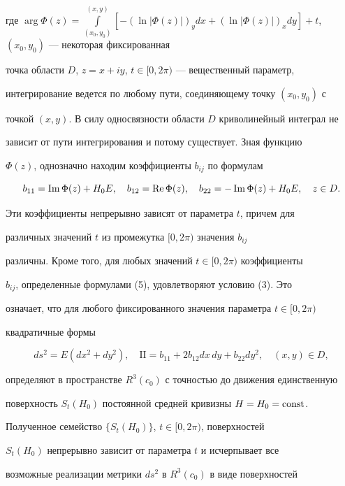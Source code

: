 где $\arg \Phi(z)=\int\limits^{(x,y)}_{(x_0,y_0)} [-(\ln|\Phi(z)|)_y dx+ 


(\ln|\Phi(z)|)_x dy]+t$, $(x_0,y_0)$ --- некоторая фиксированная 


точка области $D$, $z=x+iy$, $t\in[0,2\pi)$ --- вещественный параметр, 


интегрирование ведется по любому пути, соединяющему точку $(x_0,y_0)$ с 


точкой $(x,y)$. В силу односвязности области $D$ криволинейный интеграл не 


зависит от пути интегрирования и потому существует. Зная функцию 


$\Phi(z)$, однозначно находим коэффициенты $b_{ij}$ по формулам 


\begin{equation} 


b_{11}=\im\Phi(z)+H_0E,\quad b_{12}=\re\Phi(z),\quad 


b_{22}=-\im\Phi(z)+H_0E,\quad z\in D. 


\end{equation} 


Эти коэффициенты непрерывно зависят от параметра $t$, причем для 


различных значений $t$ из промежутка $[0,2\pi)$ значения $b_{ij}$ 


различны. Кроме того, для любых значений $t\in[0,2\pi)$ коэффициенты 


$b_{ij}$, определенные формулами (5), удовлетворяют условию (3). Это 


означает, что для любого фиксированного значения параметра $t\in[0,2\pi)$ 


квадратичные формы 


$$ 


ds^2=E(dx^2+dy^2),\quad \mathrm{II}=b_{11}+2b_{12}dx\,dy+b_{22}dy^2,\quad 


(x,y)\in D, 


$$ 


определяют в пространстве $R^3(c_0)$ с точностью до движения единственную 


поверхность $S_t(H_0)$ постоянной средней кривизны $H=H_0=\operatorname{const}$. 


Полученное семейство $\{S_t(H_0)\}$, $t\in[0,2\pi)$, поверхностей 


$S_t(H_0)$ непрерывно зависит от параметра $t$ и исчерпывает все 


возможные реализации метрики $ds^2$ в $R^3(c_0)$ в виде поверхностей 


